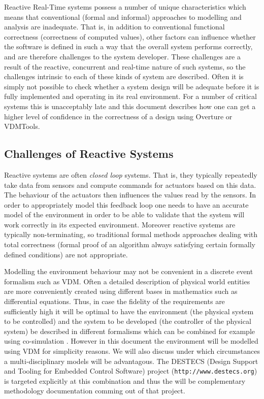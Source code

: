 \documentclass{overturerepchap}
\newcommand{\VDMTools}{VDMTools}
\newcommand{\url}[1]{\texttt{#1}}
\begin{document}
Reactive Real-Time systems possess a number of unique characteristics
which means that conventional (formal and informal) approaches to
modelling and analysis are inadequate. That is, in addition to
conventional functional correctness (correctness of computed values),
other factors can influence whether the software is defined in such a
way that the overall system performs correctly, and are therefore
challenges to the system developer. These challenges are a result of
the reactive, concurrent and real-time nature of such systems, so the
challenges intrinsic to each of these kinds of system are
described. Often it is simply not possible to check whether a system
design will be adequate before it is fully implemented and operating
in its real environment. For a number of critical systems this is
unacceptably late and this document describes how one can get a higher
level of confidence in the correctness of a design using Overture or 
\VDMTools.

\subsection{Challenges of Reactive Systems}

Reactive systems are often \emph{closed loop} systems. That is, they
typically repeatedly take data from sensors and compute commands for
actuators based on this data. The behaviour of the actuators then
influences the values read by the sensors. In order to appropriately
model this feedback loop one needs to have an accurate model of the
environment in order to be able to validate that the system will work
correctly in its expected environment. Moreover reactive systems are
typically non-terminating, so traditional formal methods approaches
dealing with total correctness (formal proof of an algorithm always 
satisfying certain formally defined conditions) are not appropriate. 

Modelling the environment behaviour may not be convenient in a
discrete event formalism such as VDM. Often a detailed description of
physical world entities are more conveniently created using different
bases in mathematics such as differential equations. Thus, in case the
fidelity of the requirements are sufficiently high it will be optimal
to have the environment (the physical system to be controlled) and the
system to be developed (the controller of the physical system) be
described in different formalisms which can be combined for example
using co-simulation \cite{Broenink&10}. However in this document the
environment will be modelled using VDM for simplicity reasons. We will
also discuss under which circumstances a multi-disciplinary models
will be advantagous. The DESTECS (Design Support and Tooling for
Embedded Control Software) project (\url{http://www.destecs.org}) is
targeted explicitly at this combination and thus the will be
complementary methodology documentation comming out of that project.
\end{document}
